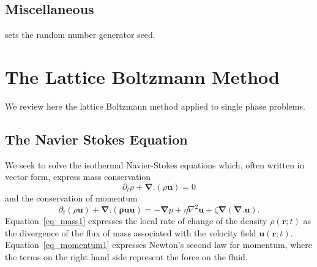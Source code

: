 \subsection{Miscellaneous}


sets the random number generator seed.




\section{The Lattice Boltzmann Method}

We review here the lattice Boltzmann method applied to single
phase problems.

\subsection{The Navier Stokes Equation}

We seek to solve the isothermal Navier-Stokes equations which, often
written in vector form, express mass conservation
\begin{equation}
\partial_t \rho + \boldsymbol{\nabla}.(\rho\mathbf{u}) = 0
\label{eq_mass1}
\end{equation}
and the conservation of momentum
\begin{equation}
\partial_t (\rho\mathbf{u}) + \boldsymbol{\nabla}.(\mathbf{\rho uu}) =
-\boldsymbol{\nabla}p + \eta \nabla^2 \mathbf{u}
+\zeta \boldsymbol{\nabla}(\boldsymbol{\nabla}.\mathbf{u}).
\label{eq_momentum1}
\end{equation}
Equation~\ref{eq_mass1} expresses the local rate of change of the
density $\rho(\mathbf{r}; t)$ as the divergence of the flux of
mass associated with the velocity field $\mathbf{u}(\mathbf{r}; t)$.
Equation~\ref{eq_momentum1} expresses Newton's second law for
momentum, where the terms on the right hand side represent the
force on the fluid.

